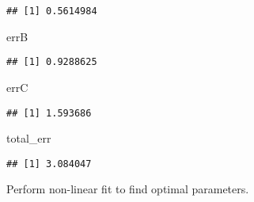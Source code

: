 \documentclass[]{article}
\newenvironment{Shaded}{\begin{snugshade}}{\end{snugshade}}
\newcommand{\NormalTok}[1]{#1}
\begin{document}
\begin{verbatim}
## [1] 0.5614984
\end{verbatim}

\begin{Shaded}
\begin{Highlighting}[]
\NormalTok{errB}
\end{Highlighting}
\end{Shaded}

\begin{verbatim}
## [1] 0.9288625
\end{verbatim}

\begin{Shaded}
\begin{Highlighting}[]
\NormalTok{errC}
\end{Highlighting}
\end{Shaded}

\begin{verbatim}
## [1] 1.593686
\end{verbatim}

\begin{Shaded}
\begin{Highlighting}[]
\NormalTok{total_err}
\end{Highlighting}
\end{Shaded}

\begin{verbatim}
## [1] 3.084047
\end{verbatim}

Perform non-linear fit to find optimal parameters.
\end{document}
